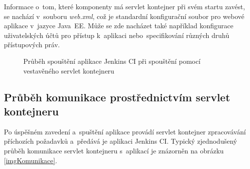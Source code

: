             Informace o~tom, které komponenty má servlet kontejner při svém startu zavést,
            se nachází v~souboru \emph{web.xml}, což je standardní konfigurační soubor
            pro webové aplikace v~jazyce Java~EE. Může se zde nacházet také například
            konfigurace uživatelských účtů pro přístup k~aplikaci nebo~specifikování
            různých druhů přístupových práv.


            \begin{figure}[h!t]
                \begin{center}
                    \caption{Průběh spouštění aplikace Jenkins CI při spouštění pomocí vestavěného servlet kontejneru}
                    \label{imgArchitekturaSpusteni}
                \end{center}
            \end{figure}


        \subsection{Průběh komunikace prostřednictvím servlet kontejneru}
            Po úspěšném zavedení a~spuštění aplikace provádí servlet kontejner
            zpracovávání příchozích požadavků a~předává je aplikaci Jenkins CI. 
            Typický zjednodušený průběh komunikace servlet kontejneru s~aplikací je znázorněn
            na obrázku \ref{imgKomunikace}. 

